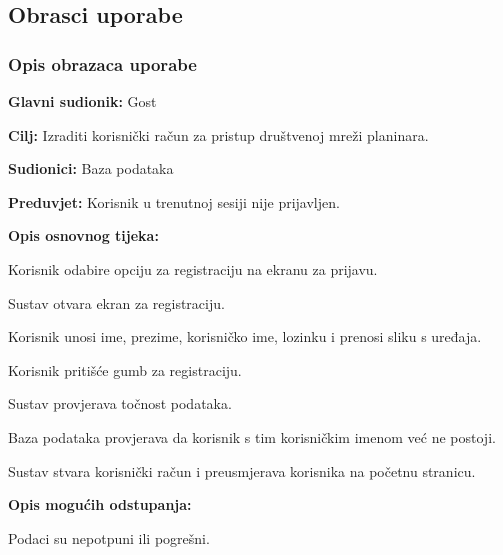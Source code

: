 	\subsection{Obrasci uporabe}
	
		\subsubsection{Opis obrazaca uporabe}
		
			\noindent {}
			\begin{packed_item}
				
				\item \textbf{Glavni sudionik: } Gost
				\item  \textbf{Cilj:} Izraditi korisnički račun za pristup društvenoj mreži planinara.
				\item  \textbf{Sudionici:} Baza podataka
				\item  \textbf{Preduvjet:} Korisnik u trenutnoj sesiji nije prijavljen.
				\item  \textbf{Opis osnovnog tijeka:}
				
				\item[] \begin{packed_enum}
					
					\item Korisnik odabire opciju za registraciju na ekranu za prijavu.
					\item Sustav otvara ekran za registraciju.
					\item Korisnik unosi ime, prezime, korisničko ime, lozinku i prenosi sliku s uređaja.
					\item Korisnik pritišće gumb za registraciju.
					\item Sustav provjerava točnost podataka.

					\item Baza podataka provjerava da korisnik s tim korisničkim imenom već ne postoji.
					\item Sustav stvara korisnički račun i preusmjerava korisnika na početnu stranicu.
				\end{packed_enum}
				
				\item  \textbf{Opis mogućih odstupanja:}
				
				\item[] \begin{packed_item}
					
					\item[5.a] Podaci su nepotpuni ili pogrešni. 
					\item[] \begin{packed_enum}
						

\end{packed_enum}
\end{packed_item}
\end{packed_item}
